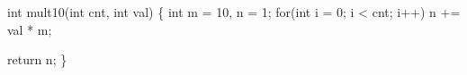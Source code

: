 \begin{minipage}{\hsize/2-0.1in}\raggedright\disableoverfull
\begin{AVerb}[gobble=2,numbers=left]
  int mult10(int cnt, int val) \{ 
    int m = 10, n = 1; \label{fig_back7_m}
    for(int i = 0; i < cnt; i++) \label{fig_back7_test}
      n += val * m; \label{fig_back7_loop}

    return n;
  \}
\end{AVerb}
\end{minipage}
